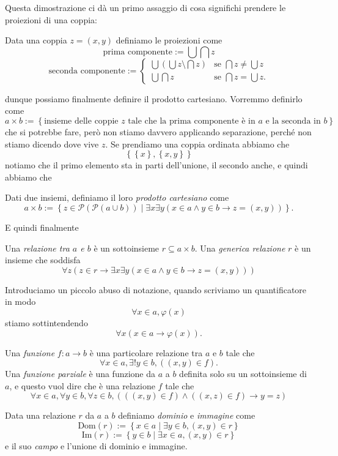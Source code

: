 \documentclass[11pt]{scrartcl}
\newcommand{\parti}[1]{\mathcal{P}\!\left(#1\right)}
\begin{document}
	Questa dimostrazione ci dà un primo assaggio di cosa significhi prendere le proiezioni di una coppia:
	\begin{definition}[Proiezioni]
		Data una coppia $z=\left(x,y\right)$ definiamo le proiezioni come
		$$\text{prima componente}:=\bigcup\bigcap z$$
		$$\text{seconda componente}:=
		\begin{cases}
			\bigcup \left(\bigcup z \setminus \bigcap z\right) & \text{se $\bigcap z \ne \bigcup z$} \\
			\bigcup\bigcap z & \text{se $\bigcap z = \bigcup z$.}
		\end{cases}
		$$
	\end{definition}
	dunque possiamo finalmente definire il prodotto cartesiano. Vorremmo definirlo come 
	$$a\times b :=\left\{\text{insieme delle coppie $z$ tale che la prima componente è in $a$ e la seconda in $b$}\right\}$$
	che si potrebbe fare, però non stiamo davvero applicando separazione, perché non stiamo dicendo dove vive $z$. Se prendiamo una coppia ordinata abbiamo che 
	$$\left\{\left\{x\right\},\left\{x,y\right\}\right\}$$
	notiamo che il primo elemento sta in parti dell'unione, il secondo anche, e quindi abbiamo che
	\begin{definition}
		Dati due insiemi, definiamo il loro \textit{prodotto cartesiano} come
		$$a\times b:=\left\{z\in \parti{\parti{a\cup b}}\mid \exists x\exists y\left(x\in a \land y \in b \to z=\left(x,y\right)\right)\right\}.$$
	\end{definition}
	E quindi finalmente
	\begin{definition}[Relazione]
		Una \textit{relazione tra $a$ e $b$} è un sottoinsieme $r\subseteq a\times b$. Una \textit{generica relazione} $r$ è un insieme che soddisfa
		$$\forall z\left(z\in r \to \exists x \exists y \left(x\in a \land y \in b \to z=(x,y)\right)\right)$$
	\end{definition}
	\begin{definition}
		Introduciamo un piccolo abuso di notazione, quando scriviamo un quantificatore in modo
		$$\forall x\in a,\varphi(x)$$
		stiamo sottintendendo 
		$$\forall x \left(x\in a \to \varphi(x)\right).$$
	\end{definition}
	\begin{definition}[Funzione]
		Una \textit{funzione} $f:a\to b$ è una particolare relazione tra $a$ e $b$ tale che 
		$$\forall x\in a, \exists!y\in b,\left((x,y)\in f\right).$$
		Una \textit{funzione parziale} è una funzione da $a$ a $b$ definita solo su un sottoinsieme di $a$, e questo vuol dire che è una relazione $f$ tale che
		$$\forall x\in a, \forall y\in b, \forall z\in b,\left((\left(x,y\right)\in f)\land (\left(x,z\right)\in f) \to y=z\right)$$
	\end{definition}
	\begin{definition}
		Data una relazione $r$ da $a$ a $b$ definiamo \textit{dominio} e \textit{immagine} come
		$$\text{Dom}\left(r\right):=\left\{x\in a\mid \exists y \in b, \left(x,y\right)\in r\right\}$$
		$$\text{Im}\left(r\right):=\left\{y\in b\mid \exists x \in a, \left(x,y\right)\in r\right\}$$
		e il suo \textit{campo} e l'unione di dominio e immagine.
	\end{definition}
\end{document}
